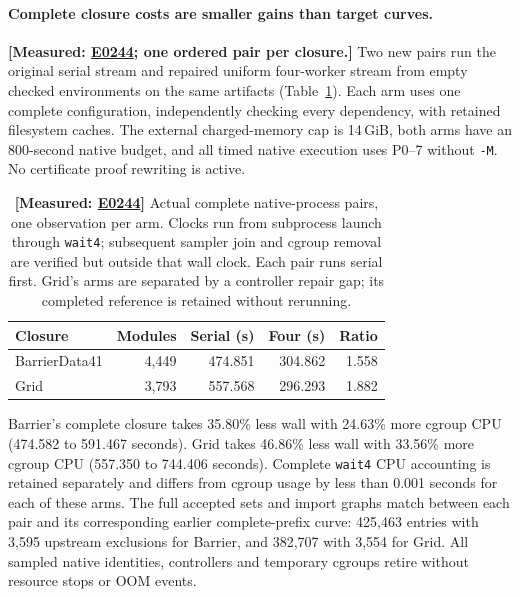 \documentclass[10pt,twocolumn]{article}
\newcommand{\measured}[1]{\textbf{[Measured: #1]}}
\newcommand{\expref}[2]{\href{https://github.com/yunwei37/proofserve/blob/main/docs/tmp/build-and-evaluate/step-#1/step-report.md}{E#2}}
\begin{document}
\paragraph{Complete closure costs are smaller gains than target curves.}
\measured{\expref{0244-20261101T101651+0000}{0244}; one ordered pair per closure.}
Two new pairs run the original serial stream and repaired uniform
four-worker stream from empty checked environments on the same artifacts
(Table~\ref{tab:fullcomputestream}).
Each arm uses one complete configuration, independently checking every
dependency, with retained filesystem caches.
The external charged-memory cap is 14\,GiB, both arms have an 800-second
native budget, and all timed native execution uses P0--7 without
\texttt{-M}. No certificate proof rewriting is active.

\begin{table}[t]
\centering\small\setlength{\tabcolsep}{3pt}
\begin{tabular}{lrrrr}
\toprule
Closure & Modules & Serial (s) & Four (s) & Ratio\\
\midrule
BarrierData41 &4,449&474.851&304.862&1.558\\
Grid &3,793&557.568&296.293&1.882\\
\bottomrule
\end{tabular}
\caption{\measured{\expref{0244-20261101T101651+0000}{0244}} Actual complete native-process pairs, one observation per arm.
Clocks run from subprocess launch through \texttt{wait4}; subsequent
sampler join and cgroup removal are verified but outside that wall clock.
Each pair runs serial first. Grid's arms are separated by a controller
repair gap; its completed reference is retained without rerunning.}
\label{tab:fullcomputestream}
\end{table}

Barrier's complete closure takes 35.80\% less wall with 24.63\% more
cgroup CPU (474.582 to 591.467 seconds).
Grid takes 46.86\% less wall with 33.56\% more cgroup CPU
(557.350 to 744.406 seconds).
Complete \texttt{wait4} CPU accounting is retained separately and differs
from cgroup usage by less than 0.001 seconds for each of these arms.
The full accepted sets and import graphs match between each pair and its
corresponding earlier complete-prefix curve:
425,463 entries with 3,595 upstream exclusions for Barrier, and
382,707 with 3,554 for Grid.
All sampled native identities, controllers and temporary cgroups retire
without resource stops or OOM events.
\end{document}

